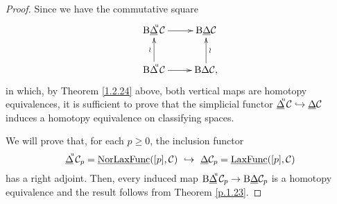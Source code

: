 \documentclass[]{amsart}
\begin{document}
\begin{proof} Since we have the commutative square
$$
\xymatrix{{\ensuremath{\mathrm{B}}}{\ensuremath{\underline{\Delta}}}\hspace{-3pt}^{^\mathrm{u}}{\ensuremath{\mathcal{C}}}\ar[r]&{\ensuremath{\mathrm{B}}}{\ensuremath{\underline{\Delta}}}{\ensuremath{\mathcal{C}}}\\
{\ensuremath{\mathrm{B}}}{\ensuremath{\Delta}}\hspace{-3pt}^{^\mathrm{u}}{\ensuremath{\mathcal{C}}}\ar[u]^-{\wr}\ar[r]&{\ensuremath{\mathrm{B}}}{\ensuremath{\Delta}}{\ensuremath{\mathcal{C}}},\ar[u]_-{\wr}}
$$
in which, by Theorem \ref{1.2.24} above,  both vertical maps are homotopy equivalences, it is
sufficient to prove that the simplicial functor
${\ensuremath{\underline{\Delta}}}\hspace{-3pt}^{^\mathrm{u}}{\ensuremath{\mathcal{C}}}\hookrightarrow {\ensuremath{\underline{\Delta}}}{\ensuremath{\mathcal{C}}}$ induces a homotopy equivalence on
classifying spaces.

We will prove that, for each $p\geq 0$, the inclusion functor
$$
{\ensuremath{\underline{\Delta}}}\hspace{-3pt}^{^\mathrm{u}}{\ensuremath{\mathcal{C}}}_p={\ensuremath{\underline{\mathrm{NorLaxFunc}}}}([p],{\ensuremath{\mathcal{C}}})\ \hookrightarrow\ {\ensuremath{\underline{\Delta}}}{\ensuremath{\mathcal{C}}}_p={\ensuremath{\underline{\mathrm{LaxFunc}}}}([p],{\ensuremath{\mathcal{C}}})
$$
has a right adjoint. Then, every induced map ${\ensuremath{\mathrm{B}}}
{\ensuremath{\underline{\Delta}}}\hspace{-3pt}^{^\mathrm{u}}{\ensuremath{\mathcal{C}}}_p\to{\ensuremath{\mathrm{B}}}{\ensuremath{\underline{\Delta}}}{\ensuremath{\mathcal{C}}}_p$ is a homotopy equivalence and the result
follows from Theorem \ref{p.1.23}.


\end{proof}
\end{document}
